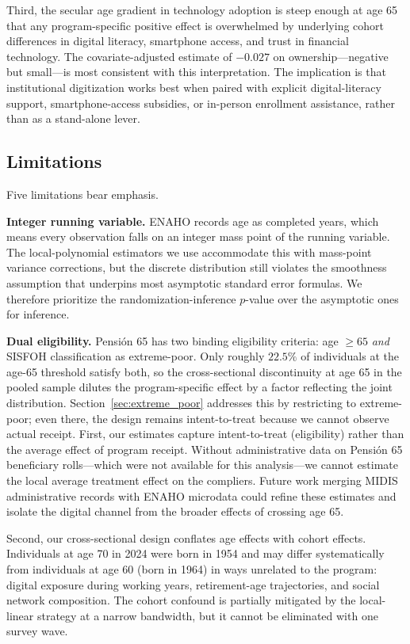 \documentclass[12pt]{article}
\begin{document}
Third, the secular age gradient in technology adoption is steep enough at age 65 that any program-specific positive effect is overwhelmed by underlying cohort differences in digital literacy, smartphone access, and trust in financial technology. The covariate-adjusted estimate of $-0.027$ on ownership---negative but small---is most consistent with this interpretation. The implication is that institutional digitization works best when paired with explicit digital-literacy support, smartphone-access subsidies, or in-person enrollment assistance, rather than as a stand-alone lever.

\subsection{Limitations}

Five limitations bear emphasis.

\textbf{Integer running variable.} ENAHO records age as completed years, which means every observation falls on an integer mass point of the running variable. The local-polynomial estimators we use accommodate this with mass-point variance corrections, but the discrete distribution still violates the smoothness assumption that underpins most asymptotic standard error formulas. We therefore prioritize the randomization-inference $p$-value over the asymptotic ones for inference.

\textbf{Dual eligibility.} Pensi\'on 65 has two binding eligibility criteria: age $\ge 65$ \emph{and} SISFOH classification as extreme-poor. Only roughly $22.5\%$ of individuals at the age-65 threshold satisfy both, so the cross-sectional discontinuity at age 65 in the pooled sample dilutes the program-specific effect by a factor reflecting the joint distribution. Section~\ref{sec:extreme_poor} addresses this by restricting to extreme-poor; even there, the design remains intent-to-treat because we cannot observe actual receipt. First, our estimates capture intent-to-treat (eligibility) rather than the average effect of program receipt. Without administrative data on Pensi\'on 65 beneficiary rolls---which were not available for this analysis---we cannot estimate the local average treatment effect on the compliers. Future work merging MIDIS administrative records with ENAHO microdata could refine these estimates and isolate the digital channel from the broader effects of crossing age 65.

Second, our cross-sectional design conflates age effects with cohort effects. Individuals at age 70 in 2024 were born in 1954 and may differ systematically from individuals at age 60 (born in 1964) in ways unrelated to the program: digital exposure during working years, retirement-age trajectories, and social network composition. The cohort confound is partially mitigated by the local-linear strategy at a narrow bandwidth, but it cannot be eliminated with one survey wave.
\end{document}
